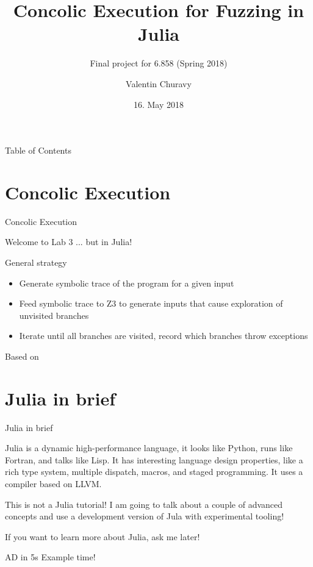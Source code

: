 \documentclass[aspectratio=169]{beamer}
\title{Concolic Execution for Fuzzing in Julia}
\subtitle{Final project for 6.858 (Spring 2018)}
\author{Valentin Churavy}
\institute[CSAIL]{JuliaLab@CSAIL}
\date{16. May 2018}
\begin{document}
  \begin{frame}[plain]
    \titlepage
  \end{frame}
  \begin{frame}{Table of Contents}
    \tableofcontents[hideallsubsections]
  \end{frame}
  \section{Concolic Execution}
  \begin{frame}{Concolic Execution}
      \begin{block}{Welcome to Lab 3}
          \pause
          ... but in Julia!
      \end{block}
\pause
      \begin{block}{General strategy}
          \begin{itemize}[<+->]
          \item Generate symbolic trace of the program for a given input
          \item Feed symbolic trace to Z3 to generate inputs that cause exploration of unvisited branches
          \item Iterate until all branches are visited, record which branches throw exceptions
      \end{itemize}
          Based on \cite{Godefroid2005-ld, Cadar2006-hs}
      \end{block}
  \end{frame}
  \section{Julia in brief}
  \begin{frame}{Julia in brief}
      \begin{block}{}
          Julia \cite{Bezanson2012-iw} is a dynamic high-performance language, it looks like Python, runs like Fortran,
      and talks like Lisp. It has interesting language design properties, like a rich type
          system, multiple dispatch, macros, and staged programming. It uses a compiler based on LLVM\cite{Lattner2004-dv}.
      \end{block}

      \pause
      \begin{exampleblock}{This is not a Julia tutorial!}
          I am going to talk about a couple of advanced concepts and use a
          development version of Jula with experimental tooling!

          If you want to learn more about Julia, ask me later!
      \end{exampleblock}

      \pause
      \begin{block}{AD in 5s}
          Example time!
      \end{block}
  \end{frame}
\end{document}
